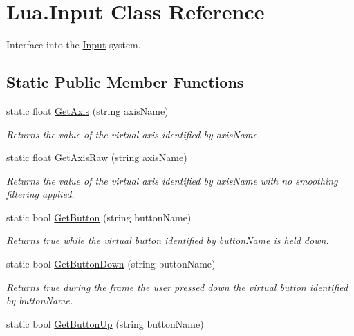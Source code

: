 \hypertarget{class_lua_1_1_input}{}\section{Lua.\+Input Class Reference}
\label{class_lua_1_1_input}


Interface into the \mbox{\hyperlink{class_lua_1_1_input}{Input}} system.  


\subsection*{Static Public Member Functions}
\begin{DoxyCompactItemize}
\item 
static float \mbox{\hyperlink{class_lua_1_1_input_a616e22e4f3b9c973c9763c10dc495395}{Get\+Axis}} (string axis\+Name)
\begin{DoxyCompactList}\small\item\em Returns the value of the virtual axis identified by axis\+Name. \end{DoxyCompactList}\item 
static float \mbox{\hyperlink{class_lua_1_1_input_aa25e7d2e0c828c4661e8a77db269e5b3}{Get\+Axis\+Raw}} (string axis\+Name)
\begin{DoxyCompactList}\small\item\em Returns the value of the virtual axis identified by axis\+Name with no smoothing filtering applied. \end{DoxyCompactList}\item 
static bool \mbox{\hyperlink{class_lua_1_1_input_ac45bfbc1aaa71822f9dd32ee446e3e26}{Get\+Button}} (string button\+Name)
\begin{DoxyCompactList}\small\item\em Returns true while the virtual button identified by button\+Name is held down. \end{DoxyCompactList}\item 
static bool \mbox{\hyperlink{class_lua_1_1_input_a59b2338d29a39f0694aebef890598b7c}{Get\+Button\+Down}} (string button\+Name)
\begin{DoxyCompactList}\small\item\em Returns true during the frame the user pressed down the virtual button identified by button\+Name. \end{DoxyCompactList}\item 
static bool \mbox{\hyperlink{class_lua_1_1_input_a74cdd1903a2b531d575a20ea9cbb0ec0}{Get\+Button\+Up}} (string button\+Name)

\end{DoxyCompactItemize}
